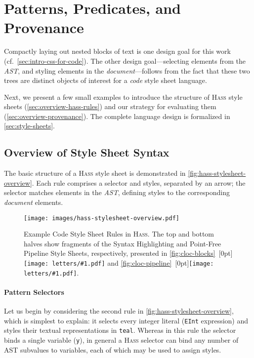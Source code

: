 \documentclass[acmsmall, screen]{acmart}
\newcommand{\parahead}[1]
  {\paragraph{\textbf{#1}}}
\newcommand{\hass}
{\textsc{Hass}}
\newcommand{\cssAttr}[1]
{\texttt{#1}}
\newcommand{\refBubbleSmall}[1]
  {~\raisebox{-0.028in}[0pt]{\texttt{[image: letters/\#1.pdf]}}}
\begin{document}
  


\section{Patterns, Predicates, and Provenance}
\label{sec:ppp}




Compactly laying out nested blocks of text is one design goal for this work (cf.~\autoref{sec:intro-css-for-code}).
The other design goal---selecting elements from the \emph{AST}, and styling elements in the \emph{document}---follows from the fact that these two trees are distinct objects of interest for a \emph{code} style sheet language.

Next, we present a few small examples to introduce the structure of \hass{} style sheets (\autoref{sec:overview-hass-rules}) and our strategy for evaluating them (\autoref{sec:overview-provenance}).
The complete language design is formalized in \autoref{sec:style-sheets}.


\subsection{Overview of Style Sheet Syntax}
\label{sec:overview-hass-rules}

The basic structure of a \hass{} style sheet is demonstrated in \autoref{fig:hass-stylesheet-overview}.
Each rule comprises a selector and styles, separated by an arrow; the selector matches elements in the \emph{AST}, defining styles to the corresponding \emph{document} elements.

\begin{figure}[b]
  \texttt{[image: images/hass-stylesheet-overview.pdf]}
  \caption{
Example Code Style Sheet Rules in \hass{}.
The top and bottom halves show fragments of the Syntax Highlighting and Point-Free Pipeline Style Sheets, respectively, presented in \autoref{fig:cloc-blocks}\refBubbleSmall{a} and \autoref{fig:cloc-pipeline}\refBubbleSmall{f}.
  }
  \label{fig:hass-stylesheet-overview}
\end{figure}

 
\parahead{Pattern Selectors}

Let us begin by considering the second rule in \autoref{fig:hass-stylesheet-overview}, which is simplest to explain:
it selects every integer literal (\texttt{EInt} expression) and styles their textual representations in \cssAttr{teal}.
Whereas in this rule the selector binds a single variable (\texttt{y}), in general a \hass{} selector can bind any number of AST subvalues to variables, each of which may be used to assign styles.
\end{document}
